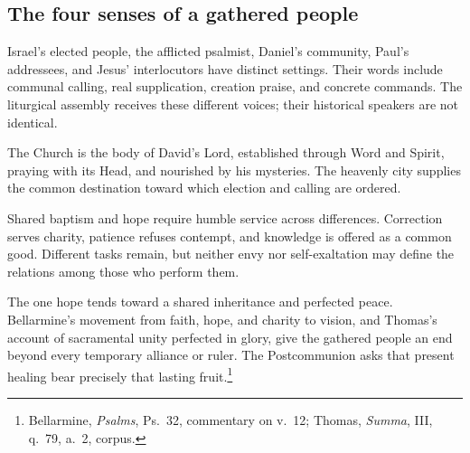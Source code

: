 \subsection{The four senses of a gathered people}
\begin{fourSenses}
\item[Literal.] Israel's elected people, the afflicted psalmist, Daniel's community, Paul's addressees, and Jesus' interlocutors have distinct settings. Their words include communal calling, real supplication, creation praise, and concrete commands. The liturgical assembly receives these different voices; their historical speakers are not identical.

\item[Allegorical.] The Church is the body of David's Lord, established through Word and Spirit, praying with its Head, and nourished by his mysteries. The heavenly city supplies the common destination toward which election and calling are ordered.

\item[Moral.] Shared baptism and hope require humble service across differences. Correction serves charity, patience refuses contempt, and knowledge is offered as a common good. Different tasks remain, but neither envy nor self-exaltation may define the relations among those who perform them.

\item[Anagogical.] The one hope tends toward a shared inheritance and perfected peace. Bellarmine's movement from faith, hope, and charity to vision, and Thomas's account of sacramental unity perfected in glory, give the gathered people an end beyond every temporary alliance or ruler. The Postcommunion asks that present healing bear precisely that lasting fruit.\footnote{Bellarmine, \textit{Psalms}, Ps.~32, commentary on v.~12; Thomas, \textit{Summa}, III, q.~79, a.~2, corpus.}
\end{fourSenses}

